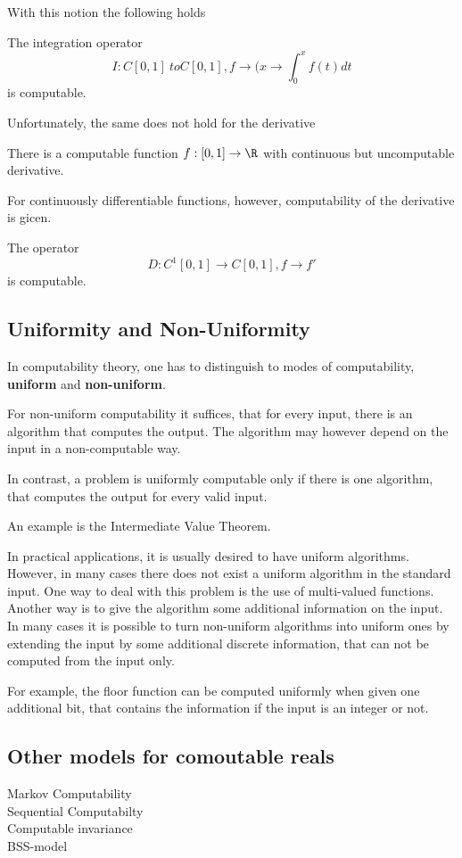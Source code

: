 With this notion the following holds
\begin{theorem}
The integration operator 
$$I: C[0,1] \ to C[0,1], f \to (x \to \int_0^x f(t) dt$$   
is computable.
\end{theorem}
Unfortunately, the same does not hold for the derivative
\begin{theorem}[Myhill 1971]
There is a computable function $f: [0,1] \to \R$ with continuous but uncomputable derivative. 
\end{theorem}
For continuously differentiable functions, however, computability of the
derivative is gicen. 
\begin{theorem}
The operator 
$$ D: C^1[0,1] \to C[0,1], f \to f'$$
is computable.
\end{theorem}
\subsection{Uniformity and Non-Uniformity}
In computability theory, one has to distinguish to modes of computability, \textbf{uniform} and \textbf{non-uniform}.

For non-uniform computability it suffices, that for every input, there is an algorithm that computes the output. 
The algorithm may however depend on the input in a non-computable way.

In contrast, a problem is uniformly computable only if there is one algorithm, that computes the output for every valid input. 

An example is the Intermediate Value Theorem.

In practical applications, it is usually desired to have uniform algorithms.
However, in many cases there does not exist a uniform algorithm in the standard
input.
One way to deal with this problem is the use of multi-valued functions.
Another way is to give the algorithm some additional information on the input.
In many cases it is possible to turn non-uniform algorithms into uniform ones
by extending the input by some additional discrete information, that can not be
computed from the input only.

For example, the floor function can be computed uniformly when given one
additional bit, that contains the information if the input is an integer or
not.  
\subsection{Other models for comoutable reals}
Markov Computability \\ 
Sequential Computabilty \\
Computable invariance \\
BSS-model \\
